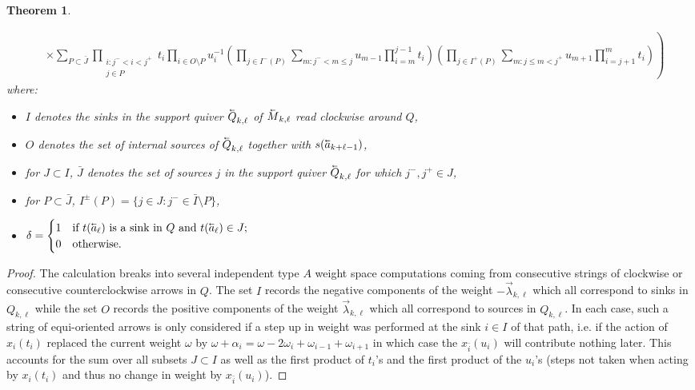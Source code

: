 \documentclass[11pt]{amsart}
\newcommand{\cev}[1]{\reflectbox{\!\ensuremath{\vec{\,\reflectbox{\ensuremath{#1}}}}}}
\newtheorem{theorem}{Theorem}[section]
\numberwithin{equation}{section}
\begin{document}
{\begin{theorem}
\begin{enumerate}
\begin{align}
        \nonumber&\times\left.\sum_{P\subset\bar{J}}\prod_{\substack{i:j^-<i<j^+\\j\in P}}t_i\prod_{i\in O\setminus P}u_i^{-1}\left(\prod_{j\in I^-(P)}\sum_{m:j^-<m\le j}u_{m-1}\prod_{i=m}^{j-1} t_i\right)\left(\prod_{j\in I^+(P)}\sum_{m:j\le m<j^+}u_{m+1}\prod_{i=j+1}^{m} t_i\right)\right)
      \end{align}
      where:
      \begin{itemize}
        \item $I$ denotes the sinks in the support quiver $\cev{Q}_{k,\ell}$ of $\cev{M}_{k,\ell}$ read clockwise around $Q$,
        \item $O$ denotes the set of internal sources of $\cev{Q}_{k,\ell}$ together with $s(\cev{a}_{k+\ell-1})$,
        \item for $J\subset I$, $\bar{J}$ denotes the set of sources $j$ in the support quiver $\cev{Q}_{k,\ell}$ for which $j^-,j^+\in J$,
        \item for $P\subset\bar{J}$, $I^\pm(P)=\{j\in J:j^-\in\bar{I}\setminus P\}$,
        \item $\delta=\begin{cases}1 & \text{if $t(\cev{a}_\ell)$ is a sink in $Q$ and $t(\cev{a}_\ell)\in J$;}\\0 & \text{otherwise.}\end{cases}$
      \end{itemize}
    \end{enumerate}
  \end{theorem}
  \begin{proof}

    The calculation breaks into several independent type $A$ weight space computations coming from consecutive strings of clockwise or consecutive counterclockwise arrows in $Q$.  The set $I$ records the negative components of the weight $-\vec{\lambda}_{k,\ell}$ which all correspond to sinks in $Q_{k,\ell}$ while the set $O$ records the positive components of the weight $\vec{\lambda}_{k,\ell}$ which all correspond to sources in $Q_{k,\ell}$.  In each case, such a string of equi-oriented arrows is only considered if a step up in weight was performed at the sink $i\in I$ of that path, i.e. if the action of $x_i(t_i)$ replaced the current weight $\omega$ by $\omega+\alpha_i=\omega-2\omega_i+\omega_{i-1}+\omega_{i+1}$ in which case the $x_{\bar{i}}(u_i)$ will contribute nothing later.  This accounts for the sum over all subsets $J\subset I$ as well as the first product of $t_i$'s and the first product of the $u_i$'s (steps not taken when acting by $x_i(t_i)$ and thus no change in weight by $x_{\bar{i}}(u_i)$).


\end{proof}}
\end{document}
